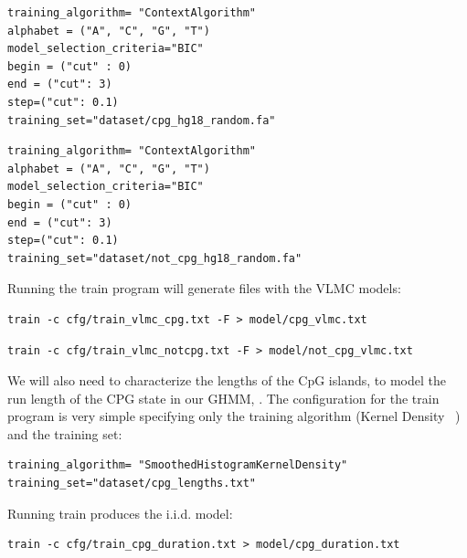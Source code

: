 \documentclass[10pt]{article}
\begin{document}
\vspace{1em}
\begin{Verbatim}[frame=single, label=train\_vlmc\_cpg.txt]
training_algorithm= "ContextAlgorithm"
alphabet = ("A", "C", "G", "T")
model_selection_criteria="BIC"
begin = ("cut" : 0)
end = ("cut": 3)
step=("cut": 0.1)
training_set="dataset/cpg_hg18_random.fa"
\end{Verbatim}
\vspace{1em}

\vspace{1em}
\begin{Verbatim}[frame=single, label=train\_vlmc\_notcpg.txt]
training_algorithm= "ContextAlgorithm"
alphabet = ("A", "C", "G", "T")
model_selection_criteria="BIC"
begin = ("cut" : 0)
end = ("cut": 3)
step=("cut": 0.1)
training_set="dataset/not_cpg_hg18_random.fa"
\end{Verbatim}
\vspace{1em}

Running the train program will generate files with the VLMC models:
\begin{Verbatim}[frame=single, label={Command line}]
train -c cfg/train_vlmc_cpg.txt -F > model/cpg_vlmc.txt
\end{Verbatim}

\begin{Verbatim}[frame=single, label={Command line}]
train -c cfg/train_vlmc_notcpg.txt -F > model/not_cpg_vlmc.txt
\end{Verbatim}

We will also need to characterize the lengths of the CpG islands, to model the run length of the CPG state in our GHMM, . The configuration for the train program is very simple specifying only the training algorithm (Kernel Density ~\cite{Sheather2004}) and the training set:
\vspace{1em}
\begin{Verbatim}[frame=single, label=train\_cpg\_duration.txt]
training_algorithm= "SmoothedHistogramKernelDensity"
training_set="dataset/cpg_lengths.txt"
\end{Verbatim}
\vspace{1em}
 
 Running train produces the i.i.d. model:
 
\begin{Verbatim}[frame=single, label={Command line}]
train -c cfg/train_cpg_duration.txt > model/cpg_duration.txt
\end{Verbatim}
\end{document}
